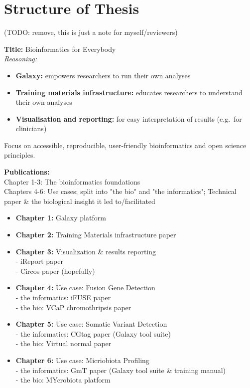 \chapter*{Structure of Thesis}
\vspace{-2cm}
(TODO: remove, this is just a note for myself/reviewers)


\textbf{Title: } Bioinformatics for Everybody \\
\textit{Reasoning: }\vspace{-1.8em}
\begin{itemize}
\itemsep-0.5em
  \item \textbf{Galaxy:} empowers researchers to run their own analyses
  \item \textbf{Training materials infrastructure:} educates researchers to understand their own analyses
  \item \textbf{Visualisation and reporting:} for easy interpretation of results (e.g.\ for clinicians)
\end{itemize}
\vspace{-1.8em}
Focus on accessible, reproducible, user-friendly bioinformatics and open science principles.


\textbf{Publications:} \\

Chapter 1-3: The bioinformatics foundations \\
Chapters 4-6: Use cases; split into "the bio" and "the informatics"; Technical paper \& the biological insight it led to/facilitated \\

\begin{itemize}
\itemsep-0.5em
\item \textbf{Chapter 1:} Galaxy platform \\
\item \textbf{Chapter 2:} Training Materials infrastructure paper \\
\item \textbf{Chapter 3:} Visualization \& results reporting \\
  - iReport paper \\
  - Circos paper (hopefully)
\item \textbf{Chapter 4:} Use case: Fusion Gene Detection \\
  - the informatics: iFUSE paper \\
  - the bio: VCaP chromothripsis paper
\item \textbf{Chapter 5:} Use case: Somatic Variant Detection \\
  - the informatics: CGtag paper (Galaxy tool suite) \\
  - the bio: Virtual normal paper
\item \textbf{Chapter 6:} Use case: Micriobiota Profiling \\
  - the informatics: GmT paper (Galaxy tool suite \& training manual) \\
  - the bio: MYcrobiota platform
\end{itemize}

